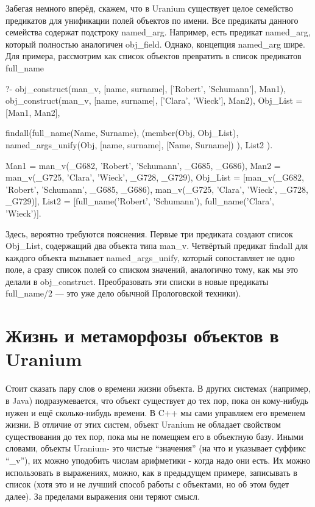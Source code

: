 \documentclass[a4paper]{book}
\def\ur{Uranium}
\begin{document}
Забегая немного вперёд, скажем, что в \ur{} существует целое
семейство предикатов для унификации полей объектов по имени. Все
предикаты данного семейства содержат подстроку
named_arg. Например, есть предикат named_arg, который полностью
аналогичен obj_field. Однако, концепция named_arg шире. Для
примера, рассмотрим как список объектов превратить в список
предикатов full_name

\begin{bigexample}{}{}
?- obj_construct(man_v, [name, surname], ['Robert', 'Schumann'],
                 Man1), 
   obj_construct(man_v, [name, surname], ['Clara', 'Wieck'],
                 Man2),
   Obj_List = [Man1, Man2], 

   findall(full_name(Name, Surname), 
           (member(Obj, Obj_List), 
            named_args_unify(Obj, [name, surname], 
                                  [Name, Surname])
            ), 
           List2
           ).

Man1 = man_v(_G682, 'Robert', 'Schumann', _G685, _G686),
Man2 = man_v(_G725, 'Clara', 'Wieck', _G728, _G729),
Obj_List = [man_v(_G682, 'Robert', 'Schumann', _G685, _G686), 
            man_v(_G725, 'Clara', 'Wieck', _G728, _G729)],
List2 = [full_name('Robert', 'Schumann'), 
         full_name('Clara', 'Wieck')].
\end{bigexample}

Здесь, вероятно требуются пояснения.  Первые три предиката
создают список Obj_List, содержащий два объекта типа
man_v. Четвёртый предикат findall для каждого объекта вызывает
named_args_unify, который сопоставляет не одно поле, а сразу
список полей со списком значений, аналогично тому, как мы это
делали в obj_construct. Преобразовать эти списки в новые
предикаты full_name/2 --- это уже дело обычной Прологовской
техники).

\section{Жизнь и метаморфозы объектов в \ur}
\label{object_life}

Стоит сказать пару слов о времени жизни объекта. В других
системах (например, в Java) подразумевается, что объект
существует до тех пор, пока он кому-нибудь нужен и ещё
сколько-нибудь времени. В C++ мы сами управляем его временем
жизни. В отличие от этих систем, объект \ur{} не обладает
свойством существования до тех пор, пока мы не помещяем его в
объектную базу. Иными словами, объекты \ur - это чистые
``значения'' (на что и указывает суффикс ``_v''), их можно
уподобить числам арифметики - когда надо они есть. Их можно
использовать в выражениях, можно, как в предыдущем примере,
записывать в список (хотя это и не лучший способ работы с
объектами, но об этом будет далее). За пределами выражения они
теряют смысл.
\end{document}
